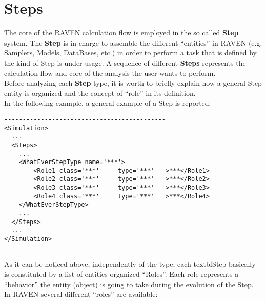 \section{Steps  \\ \vspace{2 mm} {\small }}
\label{sec:steps}
The core of the RAVEN calculation flow is employed in the so called \textbf{Step} system. The \textbf{Step} is in charge to assemble the different ``entities'' in RAVEN (e.g. Samplers, Models, DataBases, etc.) in order to perform a task that is defined by the kind of Step is under usage. A sequence of different \textbf{Steps} represents the calculation flow and core of the analysis the user wants to perform. 
\\Before analyzing each \textbf{Step} type, it is worth to briefly explain how a general Step entity is organized and the concept of ``role'' in its definition.
\\In the following example, a general example of a Step is reported:
\begin{lstlisting}[style=XML]
--------------------------------------------
<Simulation>
  ...
  <Steps>
    ...
    <WhatEverStepType name='***'>
        <Role1 class='***'     type='***'   >***</Role1>
        <Role2 class='***'     type='***'   >***</Role2>
        <Role3 class='***'     type='***'   >***</Role3>
        <Role4 class='***'     type='***'   >***</Role4>
    </WhatEverStepType>
    ...
  </Steps>
  ...
</Simulation>
--------------------------------------------
\end{lstlisting}
As it can be noticed above, independently of the type, each textbf{Step} basically is constituted by a list of entities organized ``Roles''.  Each role represents a ``behavior'' the entity (object) is going to take during the evolution of the Step.
In RAVEN several different ``roles'' are available:
